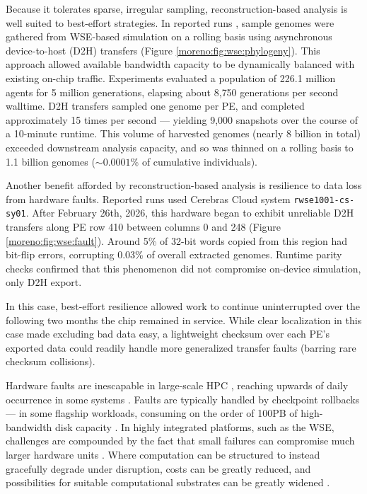 Because it tolerates sparse, irregular sampling, reconstruction-based analysis is well suited to best-effort strategies.
In reported runs \cite{singhvi2025scalable}, sample genomes were gathered from WSE-based simulation on a rolling basis using asynchronous device-to-host (D2H) transfers (Figure \ref{moreno:fig:wse:phylogeny}).
This approach allowed available bandwidth capacity to be dynamically balanced with existing on-chip traffic.
Experiments evaluated a population of 226.1 million agents for 5 million generations, elapsing about 8{\small,}750 generations per second walltime.
D2H transfers sampled one genome per PE, and completed approximately 15 times per second --- yielding 9{\small,}000 snapshots over the course of a 10-minute runtime.
This volume of harvested genomes (nearly 8 billion in total) exceeded downstream analysis capacity, and so was thinned on a rolling basis to 1.1 billion genomes ($\sim0.0001\%$ of cumulative individuals).

Another benefit afforded by reconstruction-based analysis is resilience to data loss from hardware faults.
Reported runs used Cerebras Cloud system \texttt{rwse1001-\allowbreak cs-\allowbreak sy01}.
After February 26th, 2026, this hardware began to exhibit unreliable D2H transfers along PE row 410 between columns 0 and 248 (Figure \ref{moreno:fig:wse:fault}).
Around 5\% of 32-bit words copied from this region had bit-flip errors, corrupting 0.03\% of overall extracted genomes.
Runtime parity checks confirmed that this phenomenon did not compromise on-device simulation, only D2H export.

In this case, best-effort resilience allowed work to continue uninterrupted over the following two months the chip remained in service.
While clear localization in this case made excluding bad data easy, a lightweight checksum over each PE's exported data could readily handle more generalized transfer faults (barring rare checksum collisions).

Hardware faults are inescapable in large-scale HPC \cite{gupta2017failures,navaux2023challenges}, reaching upwards of daily occurrence in some systems \cite{kokolis2025revisiting}.
Faults are typically handled by checkpoint rollbacks \cite{gupta2017failures,zhu2025understanding} --- in some flagship workloads, consuming on the order of 100PB of high-bandwidth disk capacity \cite{frontiere2025cosmological}.
In highly integrated platforms, such as the WSE, challenges are compounded by the fact that small failures can compromise much larger hardware units \cite{cerebras2025yield}.
Where computation can be structured to instead gracefully degrade under disruption, costs can be greatly reduced, and possibilities for suitable computational substrates can be greatly widened \cite{markovi2020physics,ackley2011pursue,dreslinski2010near}.

